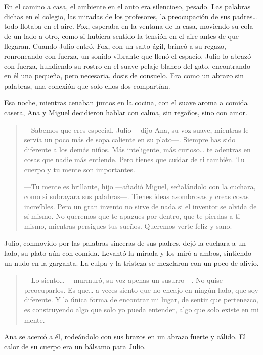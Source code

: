 \documentclass[a4paper,12pt]{book}
\begin{document}
En el camino a casa, el ambiente en el auto era silencioso, pesado. Las palabras dichas en el colegio, las miradas de los profesores, la preocupación de sus padres… todo flotaba en el aire. Fox, esperaba en la ventana de la casa, moviendo su cola de un lado a otro, como si hubiera sentido la tensión en el aire antes de que llegaran. Cuando Julio entró, Fox, con un salto ágil, brincó a su regazo, ronroneando con fuerza, un sonido vibrante que llenó el espacio. Julio lo abrazó con fuerza, hundiendo su rostro en el suave pelaje blanco del gato, encontrando en él una pequeña, pero necesaria, dosis de consuelo. Era como un abrazo sin palabras, una conexión que solo ellos dos compartían.

Esa noche, mientras cenaban juntos en la cocina, con el suave aroma a comida casera, Ana y Miguel decidieron hablar con calma, sin regaños, sino con amor.

\begin{quote}
    —Sabemos que eres especial, Julio —dijo Ana, su voz suave, mientras le servía un poco más de sopa caliente en su plato—. Siempre has sido diferente a los demás niños. Más inteligente, más curioso… te adentras en cosas que nadie más entiende. Pero tienes que cuidar de ti también. Tu cuerpo y tu mente son importantes.

    —Tu mente es brillante, hijo —añadió Miguel, señalándolo con la cuchara, como si subrayara sus palabras—. Tienes ideas asombrosas y creas cosas increíbles. Pero un gran invento no sirve de nada si el inventor se olvida de sí mismo. No queremos que te apagues por dentro, que te pierdas a ti mismo, mientras persigues tus sueños. Queremos verte feliz y sano.
\end{quote}

Julio, conmovido por las palabras sinceras de sus padres, dejó la cuchara a un lado, su plato aún con comida. Levantó la mirada y los miró a ambos, sintiendo un nudo en la garganta. La culpa y la tristeza se mezclaron con un poco de alivio.

\begin{quote}
    —Lo siento… —murmuró, su voz apenas un susurro—. No quise preocuparlos. Es que… a veces siento que no encajo en ningún lado, que soy diferente. Y la única forma de encontrar mi lugar, de sentir que pertenezco, es construyendo algo que solo yo pueda entender, algo que solo existe en mi mente.
\end{quote}

Ana se acercó a él, rodeándolo con sus brazos en un abrazo fuerte y cálido. El calor de su cuerpo era un bálsamo para Julio.
\end{document}

